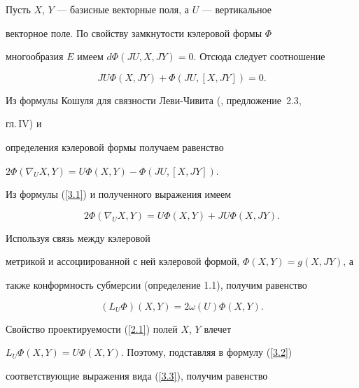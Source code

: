 \begin{pf}


Пусть $X$, $Y$ --- базисные векторные поля, а $U$ --- вертикальное


векторное поле. По свойству замкнутости кэлеровой формы $\Phi$


многообразия $E$ имеем $d\Phi (JU,X,JY)=0$. Отсюда следует соотношение


\begin{equation}


JU\Phi (X,JY)+\Phi (JU,[X,JY])=0.


\label{3.1}


\end{equation}


Из формулы Кошуля для связности Леви-Чивита (\cite{KN1}, предложение~2.3,


гл.\,IV) и


определения кэлеровой формы получаем равенство


$2\Phi (\nabla_UX,Y)=U\Phi (X,Y)-\Phi (JU,[X,JY])$.


Из формулы (\ref{3.1}) и полученного выражения имеем


\begin{equation}


2\Phi (\nabla_UX,Y)=U\Phi (X,Y)+JU\Phi (X,JY).


\label{3.2}


\end{equation}


Используя связь между кэлеровой


метрикой и ассоциированной с ней кэлеровой формой, $\Phi (X,Y)=g(X,JY)$, а


также конформность субмерсии (определение 1.1), получим равенство


\begin{equation}


(L_U\Phi )(X,Y)=2\omega (U)\Phi (X,Y).


\label{3.3}


\end{equation}


Свойство проектируемости (\ref{2.1}) полей $X$, $Y$ влечет


$L_U\Phi (X,Y)=U\Phi (X,Y)$. Поэтому, подставляя в формулу (\ref{3.2})


соответствующие выражения вида (\ref{3.3}), получим равенство


$$





\end{pf}
